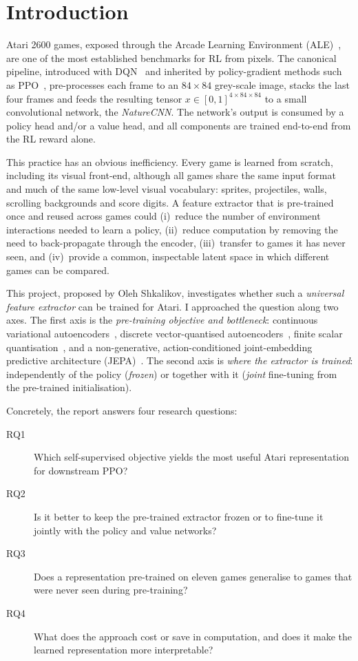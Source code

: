 \documentclass[runningheads]{llncs}
\begin{document}
\section{Introduction}
\label{sec:intro}

Atari 2600 games, exposed through the Arcade Learning Environment
(ALE)~\cite{bellemare2013ale,machado2018revisiting}, are one of the most established
benchmarks for RL from pixels. The canonical pipeline, introduced with
DQN~\cite{mnih2015human} and inherited by policy-gradient methods such as
PPO~\cite{schulman2017ppo}, pre-processes each frame to an $84\times84$ grey-scale image,
stacks the last four frames and feeds the resulting tensor
$x\in[0,1]^{4\times84\times84}$ to a small convolutional network, the \emph{NatureCNN}.
The network's output is consumed by a policy head and/or a value head, and all
components are trained end-to-end from the RL reward alone.

This practice has an obvious inefficiency. Every game is learned from scratch,
including its visual front-end, although all games share the same input format and
much of the same low-level visual vocabulary: sprites, projectiles, walls, scrolling
backgrounds and score digits. A feature extractor that is pre-trained once and reused
across games could (i)~reduce the number of environment interactions needed to learn a
policy, (ii)~reduce computation by removing the need to back-propagate through the
encoder, (iii)~transfer to games it has never seen, and (iv)~provide a common,
inspectable latent space in which different games can be compared.

This project, proposed by Oleh Shkalikov, investigates whether such a
\emph{universal feature extractor} can be trained for Atari. I approached the question
along two axes. The first axis is the \emph{pre-training objective and bottleneck}:
continuous variational autoencoders~\cite{kingma2014vae}, discrete vector-quantised
autoencoders~\cite{vandenoord2017vqvae}, finite scalar
quantisation~\cite{mentzer2024fsq}, and a non-generative, action-conditioned
joint-embedding predictive architecture
(JEPA)~\cite{lecun2022path,assran2023ijepa,bardes2024vjepa}. The second axis is
\emph{where the extractor is trained}: independently of the policy (\emph{frozen}) or
together with it (\emph{joint} fine-tuning from the pre-trained initialisation).

Concretely, the report answers four research questions:
\begin{description}
  \item[RQ1] Which self-supervised objective yields the most useful Atari
  representation for downstream PPO?
  \item[RQ2] Is it better to keep the pre-trained extractor frozen or to fine-tune it
  jointly with the policy and value networks?
  \item[RQ3] Does a representation pre-trained on eleven games generalise to games
  that were never seen during pre-training?
  \item[RQ4] What does the approach cost or save in computation, and does it make
  the learned representation more interpretable?
\end{description}
\end{document}
